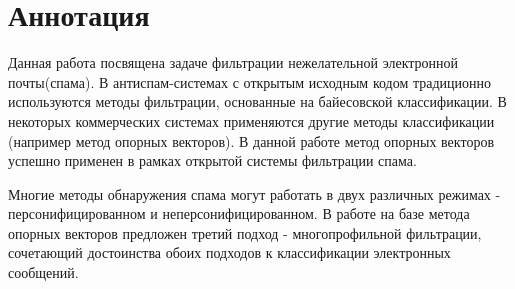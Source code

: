 \newpage
\section{Аннотация}

Данная работа посвящена задаче фильтрации нежелательной электронной почты(спама). В антиспам-системах с открытым исходным кодом традиционно используются методы фильтрации, основанные на байесовской классификации. В некоторых коммерческих системах применяются другие методы классификации (например метод опорных векторов). В данной работе метод опорных векторов успешно применен в рамках открытой системы фильтрации спама.

Многие методы обнаружения спама могут работать в двух различных режимах - персонифицированном и неперсонифицированном. В работе на базе метода опорных векторов предложен третий подход - многопрофильной фильтрации, сочетающий достоинства обоих подходов к классификации электронных сообщений.
